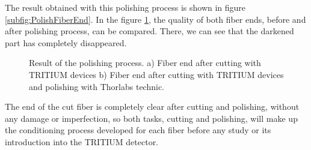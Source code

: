 The result obtained with this polishing process is shown in figure \ref{subfig:PolishFiberEnd}. In the figure \ref{fig:ResultofPolishingProcess}, the quality of both fiber ends, before and after polishing process, can be compared. There, we can see that the darkened part has completely disappeared. 

\begin{figure}[htbp]
 \centering
 \caption{Result of the polishing process. a) Fiber end after cutting with TRITIUM devices b) Fiber end after cutting with TRITIUM devices and polishing with Thorlabs technic.}
 \label{fig:ResultofPolishingProcess}
\end{figure}

The end of the cut fiber is completely clear after cutting and polishing, without any damage or imperfection, so both tasks, cutting and polishing, will make up the conditioning process developed for each fiber before any study or its introduction into the TRITIUM detector.